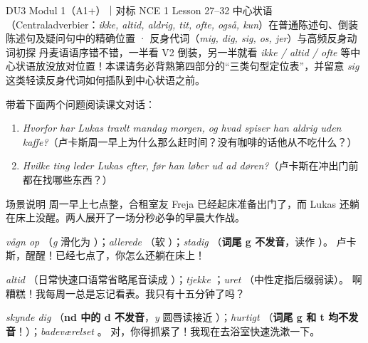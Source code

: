 {DU3 Modul 1（A1+）｜对标 NCE 1 Lesson 27--32}
{中心状语（Centraladverbier：\textit{ikke, altid, aldrig, tit, ofte, også, kun}）在普通陈述句、倒装陈述句及疑问句中的精确位置 · 反身代词（\textit{mig, dig, sig, os, jer}）与高频反身动词初探}
{丹麦语语序错不错，一半看 V2 倒装，另一半就看 \textit{ikke / altid / ofte} 等中心状语放没放对位置！本课请务必背熟第四部分的“三类句型定位表”，并留意 \textit{sig} 这类轻读反身代词如何插队到中心状语之前。}

\begin{foerduleaeser}
带着下面两个问题阅读课文对话：
\begin{enumerate}
  \item \textit{Hvorfor har Lukas travlt mandag morgen, og hvad spiser han aldrig uden kaffe?}（卢卡斯周一早上为什么那么赶时间？没有咖啡的话他从不吃什么？）
  \item \textit{Hvilke ting leder Lukas efter, før han løber ud ad døren?}（卢卡斯在冲出门前都在找哪些东西？）
\end{enumerate}
\end{foerduleaeser}


\begin{tipbox}{场景说明}
周一早上七点整，合租室友 Freja 已经起床准备出门了，而 Lukas 还躺在床上没醒。两人展开了一场分秒必争的早晨大作战。
\end{tipbox}

{\textit{vågn op} （\textit{g} 滑化为 ）；\textit{allerede} （软 ）；\textit{stadig} （\textbf{词尾 g 不发音}，读作 ）。}
{卢卡斯，醒醒！已经七点了，你怎么还躺在床上！}

{\textit{altid} （日常快速口语常省略尾音读成 ）；\textit{tjekke} ；\textit{uret} （中性定指后缀弱读）。}
{啊糟糕！我每周一总是忘记看表。我只有十五分钟了吗？}

{\textit{skynde dig} （\textbf{nd 中的 d 不发音}，\textit{y} 圆唇读接近 ）；\textit{hurtigt} （\textbf{词尾 g 和 t 均不发音}！）；\textit{badeværelset} 。}
{对，你得抓紧了！我现在去浴室快速洗漱一下。}

